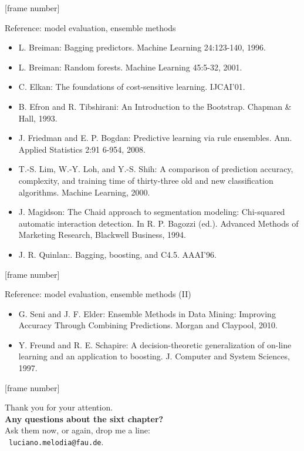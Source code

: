\documentclass[aspectratio=169,t,table]{beamer}
\begin{document}
  {
    [frame number]
    \begin{frame}{Reference: model evaluation, ensemble methods}
      \begin{itemize}
        \item L. Breiman: Bagging predictors. Machine Learning 24:123-140, 1996.
        \item L. Breiman: Random forests. Machine Learning 45:5-32, 2001.
        \item C. Elkan: The foundations of cost-sensitive learning. IJCAI'01.
        \item B. Efron and R. Tibshirani: An Introduction to the Bootstrap. Chapman \& Hall, 1993.
        \item J. Friedman and E. P. Bogdan: Predictive learning via rule ensembles. Ann. Applied Statistics 2:91 6-954, 2008.
        \item T.-S. Lim, W.-Y. Loh, and Y.-S. Shih: A comparison of prediction accuracy, complexity, and training time of thirty-three old and new classification algorithms. Machine Learning, 2000.
        \item J. Magidson: The Chaid approach to segmentation modeling: Chi-squared automatic interaction detection. In R. P. Bagozzi (ed.). Advanced Methods of Marketing Research, Blackwell Business, 1994.
        \item J. R. Quinlan:. Bagging, boosting, and C4.5. AAAI'96.
      \end{itemize}
    \end{frame}
  }

  {
    [frame number]
    \begin{frame}{Reference: model evaluation, ensemble methods (II)}
      \begin{itemize}
        \item G. Seni and J. F. Elder: Ensemble Methods in Data Mining: Improving Accuracy Through Combining Predictions. Morgan and Claypool, 2010.
        \item Y. Freund and R. E. Schapire: A decision-theoretic generalization of on-line learning and an application to boosting. J. Computer and System Sciences, 1997.
      \end{itemize}
    \end{frame}
  }

  { %
    [frame number]
    \begin{frame}[c]
      \begin{center}
        Thank you for your attention.\\
        {\bf Any questions about the sixt chapter?}\\[0.5cm]
        Ask them now, or again, drop me a line: \\
        \faSendO \ \texttt{luciano.melodia@fau.de}.
      \end{center}
    \end{frame}
  }
\end{document}
